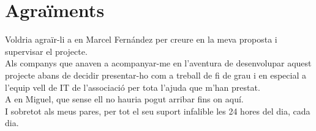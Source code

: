 \chapter*{Agraïments}

Voldria agraïr-li a en Marcel Fernández per creure en la meva proposta i supervisar el projecte.
\\

Als companys que anaven a acompanyar-me en l'aventura de desenvolupar aquest projecte abans de decidir presentar-ho com a treball de fi de grau i en especial a l'equip vell de IT de l'associació per tota l'ajuda que m'han prestat.
\\

A en Miguel, que sense ell no hauria pogut arribar fins on aquí.
\\

I sobretot als meus pares, per tot el seu suport infalible les 24 hores del dia, cada dia.